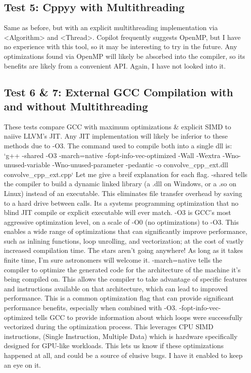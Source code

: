 \documentclass[%
 reprint,
 amsmath,amssymb,
 aps,
showkeys,
]{revtex4-2}
\begin{document}
\subsection{Test 5: Cppyy with Multithreading}
Same as before, but with an explicit multithreading implementation via <Algorithm> and <Thread>. Copilot frequently suggests OpenMP, but I have no experience with this tool, so it may be interesting to try in the future. Any optimizations found via OpenMP will likely be absorbed into the compiler, so its benefits are likely from a convenient API. Again, I have not looked into it.

\subsection{Test 6 & 7: External GCC Compilation with and without Multithreading}
These tests compare GCC with maximum optimizations & explicit SIMD to naiive LLVM's JIT. Any JIT implementation will likely be inferior to these methods due to -O3. The 
command used to compile both into a single dll is:
`g++ -shared -O3 -march=native -fopt-info-vec-optimized -Wall -Wextra -Wno-unused-variable -Wno-unused-parameter -pedantic -o convolve_cpp_ext.dll convolve_cpp_ext.cpp`
Let me give a breif explanation for each flag.
-shared tells the compiler to build a dynamic linked library (a .dll on Windows, or a .so on Linux) instead of an executable. This eliminates file transfer overhead by saving to a hard drive between calls. Its a systems programming optimization that no blind JIT compile or explicit executable will ever match.
-O3 is GCC's most aggressive optimization level, on a scale of -O0 (no optimizations) to -O3. This enables a wide range of optimizations that can significantly improve performance, such as inlining functions, loop unrolling, and vectorization; at the cost of vastly increased compilation time. The stars aren't going anywhere! As long as it takes finite time, I'm sure astronomers will welcome it.
-march=native tells the compiler to optimize the generated code for the architecture of the machine it's being compiled on. This allows the compiler to take advantage of specific features and instructions available on that architecture, which can lead to improved performance. This is a common optimization flag that can provide significant performance benefits, especially when combined with -O3.
-fopt-info-vec-optimized tells GCC to provide information about which loops were successfully vectorized during the optimization process. This leverages CPU SIMD instructions, (Single Instruction, Multiple Data) which is hardware specifically designed for GPU-like workloads. This lets us know if these optimizations happened at all, and could be a source of elusive bugs. I have it enabled to keep an eye on it.
\end{document}
